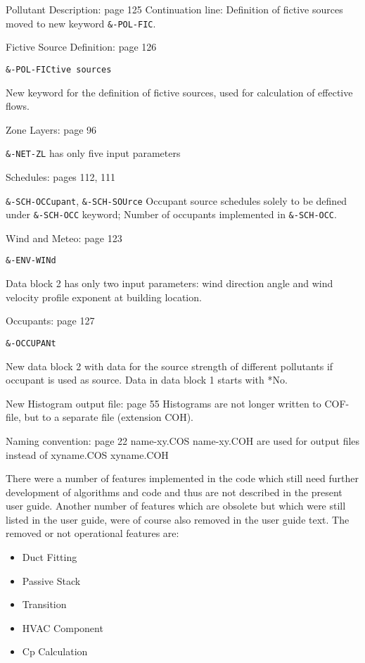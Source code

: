 \documentclass[10pt]{book}
\begin{document}
Pollutant Description: page 125 
Continuation line: 
Definition of fictive sources moved to new keyword \verb|&-POL-FIC|. 

Fictive Source Definition: page 126

\verb|&-POL-FICtive sources|

New keyword for the definition of fictive sources, used for calculation of effective flows.

Zone Layers: page 96 

\verb|&-NET-ZL| has only five input parameters 


Schedules: pages 112, 111 

\verb|&-SCH-OCCupant|, \verb|&-SCH-SOUrce|
Occupant source schedules solely to be defined under \verb|&-SCH-OCC| keyword; Number of occupants implemented in \verb|&-SCH-OCC|.

Wind and Meteo: page 123

\verb|&-ENV-WINd|

Data block 2 has only two input parameters: wind direction angle and wind velocity profile exponent at building location.

Occupants: page 127

\verb|&-OCCUPANt|

New data block 2 with data for the source strength of different pollutants if occupant is used as source. Data in data block 1 starts with *No.

New Histogram output file: page 55 Histograms are not longer written to COF-file, but to a separate file (extension COH).

Naming convention: page 22 \textlangle name\textrangle-xy.COS \textlangle name\textrangle-xy.COH are used for output files instead of xy\textlangle name\textrangle.COS xy\textlangle name\textrangle.COH

There were a number of features implemented in the code which still need further development of algorithms and code and thus are not described in the present user guide. Another number of features which are obsolete but which were still listed in the user guide, were of course also removed in the user guide text. The removed or not operational features are:

\begin{itemize}
\item Duct Fitting
\item Passive Stack
\item Transition
\item HVAC Component
\item Cp Calculation
\end{itemize}
\end{document}
